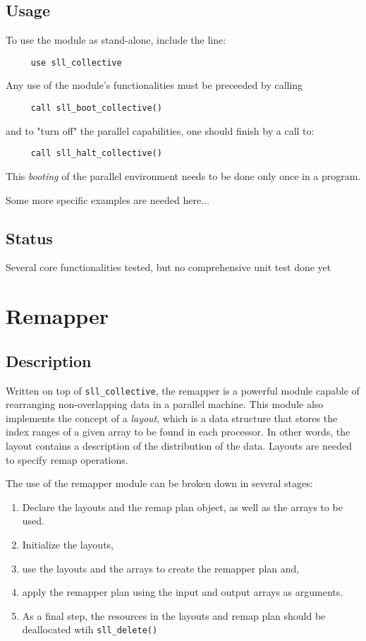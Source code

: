 \documentclass[]{report}   %
\begin{document}
\subsection{Usage}
To use the module as stand-alone, include the line:
\begin{verbatim}
     use sll_collective
\end{verbatim}
Any use of the module's functionalities must be preceeded by calling
\begin{verbatim}
     call sll_boot_collective()
\end{verbatim}
and to "turn off" the parallel capabilities, one should finish by a call to:
\begin{verbatim}
     call sll_halt_collective()
\end{verbatim}
This \emph{booting} of the parallel environment needs to be done only once in a program.

Some more specific examples are needed here...
\subsection{Status}
Several core functionalities tested, but no comprehensive unit test done yet


\section{Remapper}

\subsection{Description}
Written on top of \verb+sll_collective+, the remapper is a powerful module capable of rearranging non-overlapping data in a parallel machine. This module also implements the concept of a \emph{layout}, which is a data structure that stores the index ranges of a given array to be found in each processor. In other words, the layout contains a description of the distribution of the data. Layouts are needed to specify remap operations.


The use of the remapper module can be broken down in several stages: 

\begin{enumerate}
	\item Declare the layouts and the remap plan object, as well as the arrays to be used.
	\item Initialize the layouts,
	\item use the layouts and the arrays to create the remapper plan and,
	\item apply the remapper plan using the input and output arrays as arguments.
	\item As a final step, the resources in the layouts and remap plan should be deallocated wtih \verb+sll_delete()+
\end{enumerate}
\end{document}
